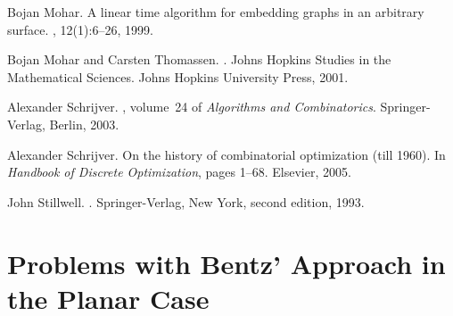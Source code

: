 \documentclass[11pt]{article}
\theoremstyle{plain}  \newtheorem{theorem}{Theorem}[section]
\theoremstyle{definition}
\begin{document}
\begin{thebibliography}{10}
Bojan Mohar.
\newblock A linear time algorithm for embedding graphs in an arbitrary surface.
, 12(1):6--26, 1999.

Bojan Mohar and Carsten Thomassen.
.
\newblock Johns Hopkins Studies in the Mathematical Sciences. Johns Hopkins
  University Press, 2001.

Alexander Schrijver.
,
  volume~24 of {\em Algorithms and Combinatorics}.
\newblock Springer-Verlag, Berlin, 2003.

Alexander Schrijver.
\newblock On the history of combinatorial optimization (till 1960).
\newblock In {\em Handbook of Discrete Optimization}, pages 1--68. Elsevier,
  2005.

John Stillwell.
.
\newblock Springer-Verlag, New York, second edition, 1993.

\end{thebibliography}


\appendix

\section{Problems with Bentz' Approach in the Planar Case}\label{A:bentz}
\end{document}
